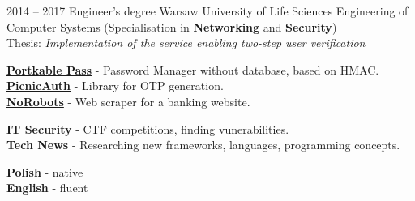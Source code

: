 \documentclass[9pt]{developercv} %
\begin{document}


\begin{entrylist}
	\entry
		{2014 -- 2017}
		{Engineer’s degree}
		{Warsaw University of Life Sciences}
		{
			Engineering of Computer Systems (Specialisation in \textbf{Networking} and \textbf{Security})\\
			Thesis: \it{Implementation of the service enabling two-step user verification}
		}
\end{entrylist}


\begin{minipage}[t]{0.4\textwidth}
	\vspace{-\baselineskip} %


	\textbf{\href{https://github.com/matishadow/portkable-pass}{Portkable Pass}} - Password Manager without database, based on HMAC.\\
	\textbf{\href{https://github.com/matishadow/PicnicAuth}{PicnicAuth}} - Library for OTP generation.\\
	\textbf{\href{https://github.com/matishadow/NoRobots}{NoRobots}} - Web scraper for a banking website.
\end{minipage}
\hfill
\begin{minipage}[t]{0.3\textwidth}
	\vspace{-\baselineskip} %


	\textbf{IT Security} - CTF competitions, finding vunerabilities.\\
	\textbf{Tech News} - Researching new frameworks, languages, programming concepts. 
\end{minipage}
\hfill
\begin{minipage}[t]{0.2\textwidth}
	\vspace{-\baselineskip} %


	\textbf{Polish} - native\\
	\textbf{English} - fluent\\
\end{minipage}

\end{document}

